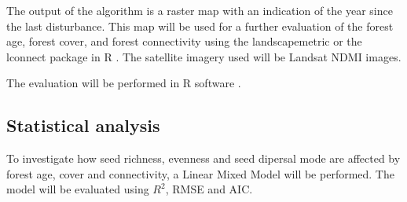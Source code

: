 The output of the algorithm is a raster map with an indication of the year since the last disturbance. This map will be used for a further evaluation of the forest age, forest cover, and forest connectivity using the landscapemetric or the lconnect package in R \citep{mestreLconnectPackageVersatile2023, hesselbarthLandscapemetricsOpensourceTool2019}. The satellite imagery used will be Landsat NDMI images.
\citep{gore}

The evaluation will be performed in R software \citep{R}.

\subsection{Statistical analysis}
To investigate how seed richness, evenness and seed dipersal mode are affected by forest age, cover and connectivity, a Linear Mixed Model will be performed. The model will be evaluated using $R^2$, RMSE and AIC.

 